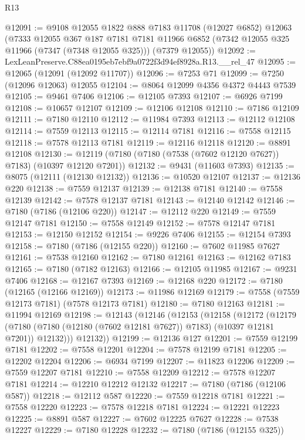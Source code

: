 \begin{lexlean}{R13}
\begin{coremodule}
@12091 := @9108
    @12055
    @1822
    @888
    @7183
    @11708
    (@12027 @6852)
    @12063
    (@7333
      @12055
      @367
      @187
      @7181
      @7181
      @11966
      @6852
      (@7342 @12055 @325 @11966 (@7347 (@7348 @12055 @325)))
      (@7379 @12055))
@12092 := LexLeanPreserve.C88ea0195eb7ebf9a0722f3d94ef8928a.R13.__rel_47
@12095 := @12065 (@12091 (@12092 @11707))
@12096 := @7253 @71
@12099 := @7250 (@12096 @12063) @12055
@12104 := @8064 @12099 @4356 @4372 @4443 @7539
@12105 := @9461 @7406
@12106 := @12105 @7393
@12107 := @6926 @7199
@12108 := @10657 @12107
@12109 := @12106 @12108
@12110 := @7186 @12109
@12111 := @7180 @12110
@12112 := @11984 @7393
@12113 := @12112 @12108
@12114 := @7559 @12113
@12115 := @12114 @7181
@12116 := @7558 @12115
@12118 := @7578 @12113 @7181
@12119 := @12116 @12118
@12120 := @8891 @12108
@12130 := @12119 (@7180 (@7180 (@7538 (@7602 @12120 @7627)) @7183) (@10397 @12120 @7201))
@12132 := @9431 (@11603 @7393)
@12135 := @8075 (@12111 (@12130 @12132))
@12136 := @10520 @12107
@12137 := @12136 @220
@12138 := @7559 @12137
@12139 := @12138 @7181
@12140 := @7558 @12139
@12142 := @7578 @12137 @7181
@12143 := @12140 @12142
@12146 := @7180 (@7186 (@12106 @220))
@12147 := @12112 @220
@12149 := @7559 @12147 @7181
@12150 := @7558 @12149
@12152 := @7578 @12147 @7181
@12153 := @12150 @12152
@12154 := @9226 @7406
@12155 := @12154 @7393
@12158 := @7180 (@7186 (@12155 @220))
@12160 := @7602 @11985 @7627
@12161 := @7538 @12160
@12162 := @7180 @12161
@12163 := @12162 @7183
@12165 := @7180 (@7182 @12163)
@12166 := @12105 @11985
@12167 := @9231 @7406
@12168 := @12167 @7393
@12169 := @12168 @220
@12172 := @7180 (@12165 (@12166 @12169))
@12173 := @11986 @12169
@12179 := @7558 (@7559 @12173 @7181) (@7578 @12173 @7181)
@12180 := @7180 @12163
@12181 := @11994 @12169
@12198 := @12143
    (@12146
      (@12153
        (@12158
          (@12172
            (@12179
              (@7180 (@7180 (@12180 (@7602 @12181 @7627)) @7183) (@10397 @12181 @7201))
              @12132)))
        @12132))
@12199 := @12136 @127
@12201 := @7559 @12199 @7181
@12202 := @7558 @12201
@12204 := @7578 @12199 @7181
@12205 := @12202 @12204
@12206 := @6934 @7199
@12207 := @11823 @12206
@12209 := @7559 @12207 @7181
@12210 := @7558 @12209
@12212 := @7578 @12207 @7181
@12214 := @12210 @12212 @12132
@12217 := @7180 (@7186 (@12106 @587))
@12218 := @12112 @587
@12220 := @7559 @12218 @7181
@12221 := @7558 @12220
@12223 := @7578 @12218 @7181
@12224 := @12221 @12223
@12225 := @8891 @587
@12227 := @7602 @12225 @7627
@12228 := @7538 @12227
@12229 := @7180 @12228
@12232 := @7180 (@7186 (@12155 @325))

\end{coremodule}
\end{lexlean}
